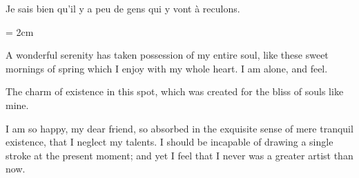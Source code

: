 \documentclass{scrbook}
\begin{document}
\parbox{3cm}{
Je sais bien qu'il y a peu de
gens qui y vont à reculons.
}


\vspace{3cm}

\parindent = 2cm

A wonderful serenity has taken possession of my entire soul, like these sweet mornings of spring which I enjoy with my whole heart. I am alone, and feel.

The charm of existence in this spot, which was created for the bliss of souls like mine. 

I am so happy, my dear friend, so absorbed in the exquisite sense of mere tranquil existence, that I neglect my talents. I should be
incapable of drawing a single stroke at the present moment; and yet I feel that I never was a greater artist than now.
\end{document}
